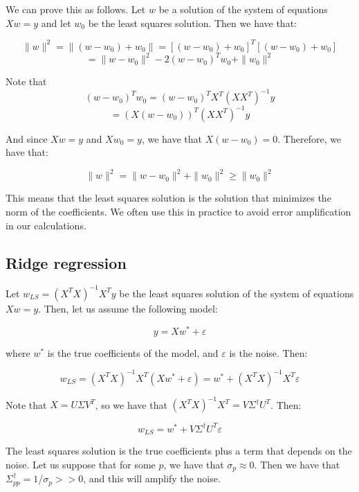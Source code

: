 We can prove this as follows. Let $w$ be a solution of the system of equations $X w = y$ and let $w_0$ be the least squares
solution. Then we have that:

$$\|w\|^2 = \|(w - w_0) + w_0\| = [(w - w_0) + w_0]^T [(w - w_0) + w_0]$$
$$= \|w - w_0\|^2 - 2 (w - w_0)^T w_0 + \|w_0\|^2$$

Note that 
$$(w - w_0)^T w_0 = (w - w_0)^T X^T(X X^T)^{-1} y$$
$$= (X (w - w_0))^T (X X^T)^{-1} y$$

And since $X w = y$ and $X w_0 = y$, we have that $X (w - w_0) = 0$. Therefore, we have that:

$$\|w\|^2 = \|w - w_0\|^2 + \|w_0\|^2 \geq \|w_0\|^2$$

This means that the least squares solution is the solution that minimizes the norm of the coefficients.
We often use this in practice to avoid error amplification in our calculations.

\subsection{Ridge regression}

Let $w_{LS} = (X^T X)^{-1} X^T y$ be the least squares solution of the system of equations $X w = y$. 
Then, let us assume the following model:

\begin{equation}
    y = X w^{*} + \varepsilon
\end{equation}

where $w^{*}$ is the true coefficients of the model, and $\varepsilon$ is the noise. Then:

\begin{equation}
    w_{LS} = (X^T X)^{-1} X^T (X w^{*} + \varepsilon) = w^{*} + (X^T X)^{-1} X^T \varepsilon
\end{equation}

Note that $X = U \Sigma V^T$, so we have that $(X^T X)^{-1} X^T = V \Sigma^{\dagger} U^T$. Then:

\begin{equation}
    w_{LS} = w^{*} + V \Sigma^{\dagger} U^T \varepsilon
\end{equation}

The least squares solution is the true coefficients plus a term that depends on the noise. Let us
suppose that for some $p$, we have that $\sigma_p \approx 0$. Then we have that $\Sigma^{\dagger}_{pp} = 1 / \sigma_p >> 0$,
and this will amplify the noise.\\

